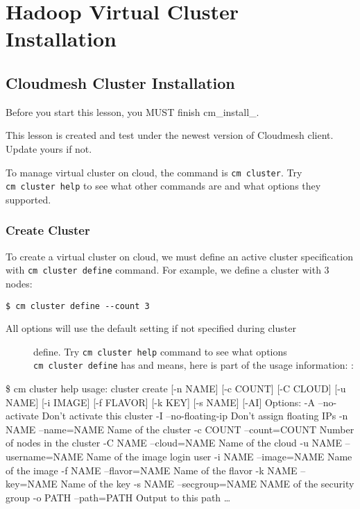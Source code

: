 \section{Hadoop Virtual Cluster
Installation}\label{hadoop-virtual-cluster-installation}

\subsection{Cloudmesh Cluster
Installation}\label{cloudmesh-cluster-installation}

Before you start this lesson, you MUST finish cm\_install\_.

This lesson is created and test under the newest version of Cloudmesh
client. Update yours if not.

To manage virtual cluster on cloud, the command is \texttt{cm\ cluster}.
Try \texttt{cm\ cluster\ help} to see what other commands are and what
options they supported.

\subsubsection{Create Cluster}\label{create-cluster}

To create a virtual cluster on cloud, we must define an active cluster
specification with \texttt{cm\ cluster\ define} command. For example, we
define a cluster with 3 nodes:

\begin{verbatim}
$ cm cluster define --count 3
\end{verbatim}

\begin{description}
\item[All options will use the default setting if not specified during
cluster]
define. Try \texttt{cm\ cluster\ help} command to see what options
\texttt{cm\ cluster\ define} has and means, here is part of the usage
information: :
\end{description}

\$ cm cluster help usage: cluster create {[}-n NAME{]} {[}-c COUNT{]}
{[}-C CLOUD{]} {[}-u NAME{]} {[}-i IMAGE{]} {[}-f FLAVOR{]} {[}-k KEY{]}
{[}-s NAME{]} {[}-AI{]} Options: -A --no-activate Don't activate this
cluster -I --no-floating-ip Don't assign floating IPs -n NAME
--name=NAME Name of the cluster -c COUNT --count=COUNT Number of nodes
in the cluster -C NAME --cloud=NAME Name of the cloud -u NAME
--username=NAME Name of the image login user -i NAME --image=NAME Name
of the image -f NAME --flavor=NAME Name of the flavor -k NAME --key=NAME
Name of the key -s NAME --secgroup=NAME NAME of the security group -o
PATH --path=PATH Output to this path \ldots{}

